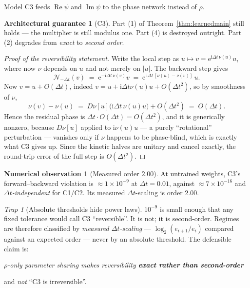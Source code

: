 \documentclass[11pt,a4paper]{article}
\theoremstyle{plain}
\theoremstyle{definition}
\newtheorem{guarantee}[theorem]{Architectural guarantee}
\newtheorem{observation}[theorem]{Numerical observation}
\theoremstyle{remark}
\newtheorem{trap}[theorem]{Trap}
\newcommand{\iu}{\mathrm{i}}
\newcommand{\eu}{\mathrm{e}}
\newcommand{\dt}{\Delta t}
\newcommand{\Nop}{\mathcal{N}}
\DeclareMathOperator{\Imag}{Im}
\DeclareMathOperator{\Real}{Re}
\begin{document}
Model C3 feeds $\Real\psi$ and $\Imag\psi$ to the phase network instead of $\rho$.

\begin{guarantee}[C3]
\label{guar:c3}
Part (1) of Theorem~\ref{thm:learnedmain} still holds --- the multiplier is still modulus
one. Part (4) is destroyed outright. Part (2) degrades from \emph{exact} to
\emph{second order}.
\end{guarantee}

\begin{proof}[Proof of the reversibility statement]
Write the local step as $u\mapsto v = \eu^{\iu\dt\,\nu(u)}u$, where now $\nu$ depends on
$u$ and not merely on $|u|$. The backward step gives
\[
\Nop_{-\dt}(v) \;=\; \eu^{-\iu\dt\,\nu(v)}v \;=\; \eu^{\,\iu\dt\,[\nu(u)-\nu(v)]}\,u .
\]
Now $v = u + O(\dt)$, indeed $v = u + \iu\dt\nu(u)u + O(\dt^2)$, so by smoothness of
$\nu$,
\[
\nu(v) - \nu(u) \;=\; D\nu[u]\bigl(\iu\dt\,\nu(u)u\bigr) + O(\dt^2) \;=\; O(\dt).
\]
Hence the residual phase is $\dt\cdot O(\dt) = O(\dt^2)$, and it is generically nonzero,
because $D\nu[u]$ applied to $\iu\nu(u)u$ --- a purely ``rotational'' perturbation ---
vanishes only if $\nu$ happens to be phase-blind, which is exactly what C3 gives up.
Since the kinetic halves are unitary and cancel exactly, the round-trip error of the full
step is $O(\dt^2)$.
\end{proof}

\begin{observation}[Measured order $2.00$]
\label{obs:c3order}
At untrained weights, C3's forward--backward violation is $\approx1\times10^{-9}$ at
$\dt=0.01$, against $\approx7\times10^{-16}$ and \emph{$\dt$-independent} for C1/C2. Its
measured $\dt$-scaling is order $2.00$.
\end{observation}

\begin{trap}[Absolute thresholds hide power laws]
\label{trap:thresholds}
$10^{-9}$ is small enough that any fixed tolerance would call C3 ``reversible''. It is
not; it is second-order. Regimes are therefore classified by \emph{measured $\dt$-scaling}
--- $\log_2(e_{i+1}/e_i)$ compared against an expected order --- never by an absolute
threshold. The defensible claim is:
\begin{center}
\emph{$\rho$-only parameter sharing makes reversibility \textbf{exact rather than
second-order}}
\end{center}
and \emph{not} ``C3 is irreversible''.
\end{trap}
\end{document}

